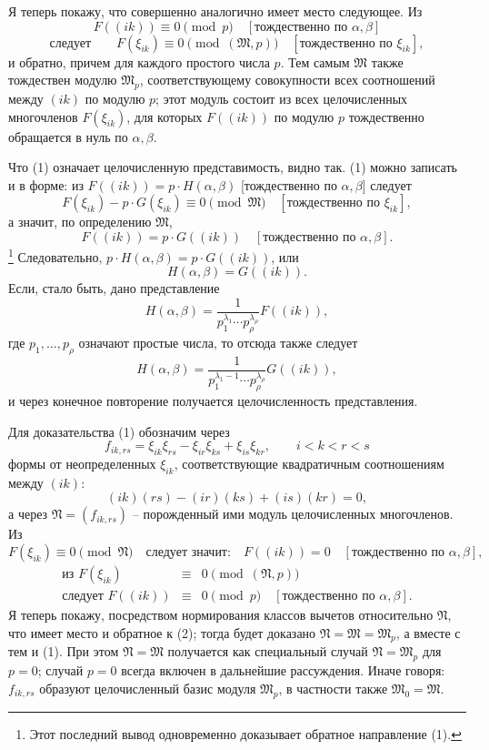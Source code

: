 \documentclass[11pt]{article}
\providecommand{\frM}{\mathfrak M}
\providecommand{\frN}{\mathfrak N}
\begin{document}
Я теперь покажу, что совершенно аналогично имеет место следующее. Из
\[
        F((ik))\equiv0\pmod p\quad [\text{тождественно по \(\alpha,\beta\)}]
\]
\begin{equation}
        \text{следует}\qquad
        F(\xi_{ik})\equiv0\pmod{(\frM,p)}\quad [\text{тождественно по \(\xi_{ik}\)}],
\end{equation}
и обратно, причем для каждого простого числа \(p\). Тем самым \(\frM\) также тождествен модулю \(\frM_p\), соответствующему совокупности всех соотношений между \((ik)\) по модулю \(p\); этот модуль состоит из всех целочисленных многочленов \(F(\xi_{ik})\), для которых \(F((ik))\) по модулю \(p\) тождественно обращается в нуль по \(\alpha,\beta\).

Что (1) означает целочисленную представимость, видно так. (1) можно записать и в форме: из \(F((ik))=p\cdot H(\alpha,\beta)\) [тождественно по \(\alpha,\beta\)] следует
\[
        F(\xi_{ik})-p\cdot G(\xi_{ik})\equiv0\pmod{\frM}
        \quad [\text{тождественно по \(\xi_{ik}\)}],
\]
а значит, по определению \(\frM\),
\[
        F((ik))=p\cdot G((ik))\quad [\text{тождественно по \(\alpha,\beta\)}].
\]
\footnote{Этот последний вывод одновременно доказывает обратное направление (1).}
Следовательно, \(p\cdot H(\alpha,\beta)=p\cdot G((ik))\), или
\[
        H(\alpha,\beta)=G((ik)).
\]
Если, стало быть, дано представление
\[
        H(\alpha,\beta)
        =
        \frac1{p_1^{\lambda_1}\cdots p_\rho^{\lambda_\rho}}
        F((ik)),
\]
где \(p_1,\ldots,p_\rho\) означают простые числа, то отсюда также следует
\[
        H(\alpha,\beta)
        =
        \frac1{p_1^{\lambda_1-1}\cdots p_\rho^{\lambda_\rho}}
        G((ik)),
\]
и через конечное повторение получается целочисленность представления.

Для доказательства (1) обозначим через
\[
        f_{ik,rs}=\xi_{ik}\xi_{rs}-\xi_{ir}\xi_{ks}+\xi_{is}\xi_{kr},
        \qquad i<k<r<s
\]
формы от неопределенных \(\xi_{ik}\), соответствующие квадратичным соотношениям между \((ik)\):
\[
        (ik)(rs)-(ir)(ks)+(is)(kr)=0,
\]
а через \(\frN=(f_{ik,rs})\) -- порожденный ими модуль целочисленных многочленов. Из
\[
        F(\xi_{ik})\equiv0\pmod{\frN}
        \quad\text{следует значит:}\quad
        F((ik))=0\quad [\text{тождественно по \(\alpha,\beta\)}],
\]
\begin{equation}
\begin{array}{rcl}
        \text{из }F(\xi_{ik})&\equiv&0\pmod{(\frN,p)}\\
        \text{следует }F((ik))&\equiv&0\pmod p\quad[\text{тождественно по \(\alpha,\beta\)}].
\end{array}
\end{equation}
Я теперь покажу, посредством нормирования классов вычетов относительно \(\frN\), что имеет место и обратное к (2); тогда будет доказано \(\frN=\frM=\frM_p\), а вместе с тем и (1). При этом \(\frN=\frM\) получается как специальный случай \(\frN=\frM_p\) для \(p=0\); случай \(p=0\) всегда включен в дальнейшие рассуждения. Иначе говоря: \(f_{ik,rs}\) образуют целочисленный базис модуля \(\frM_p\), в частности также \(\frM_0=\frM\).
\end{document}
